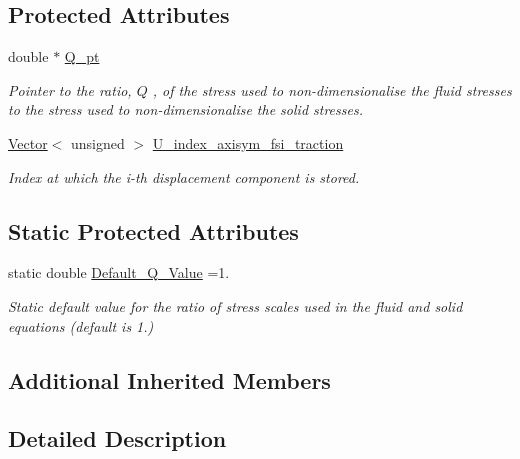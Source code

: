 \subsection*{Protected Attributes}
\begin{DoxyCompactItemize}
\item 
double $\ast$ \hyperlink{classoomph_1_1FSIAxisymmetricLinearElasticityTractionElement_affa78080f9785efcd0f29e16882b39a5}{Q\+\_\+pt}
\begin{DoxyCompactList}\small\item\em Pointer to the ratio, $ Q $ , of the stress used to non-\/dimensionalise the fluid stresses to the stress used to non-\/dimensionalise the solid stresses. \end{DoxyCompactList}\item 
\hyperlink{classoomph_1_1Vector}{Vector}$<$ unsigned $>$ \hyperlink{classoomph_1_1FSIAxisymmetricLinearElasticityTractionElement_a498d38f6c82f550778ff0e8c1e9e77bc}{U\+\_\+index\+\_\+axisym\+\_\+fsi\+\_\+traction}
\begin{DoxyCompactList}\small\item\em Index at which the i-\/th displacement component is stored. \end{DoxyCompactList}\end{DoxyCompactItemize}
\subsection*{Static Protected Attributes}
\begin{DoxyCompactItemize}
\item 
static double \hyperlink{classoomph_1_1FSIAxisymmetricLinearElasticityTractionElement_aeff21738ba20eccede00f1db688e5a2a}{Default\+\_\+\+Q\+\_\+\+Value} =1.
\begin{DoxyCompactList}\small\item\em Static default value for the ratio of stress scales used in the fluid and solid equations (default is 1.) \end{DoxyCompactList}\end{DoxyCompactItemize}
\subsection*{Additional Inherited Members}


\subsection{Detailed Description}
